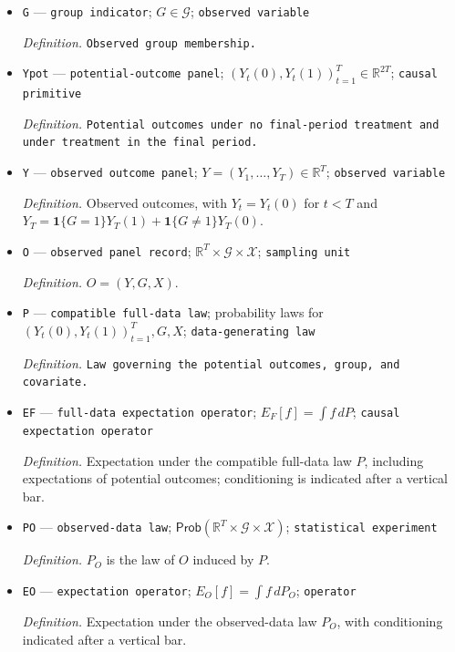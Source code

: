 \documentclass{article}
\begin{document}
\begin{itemize}
  \item \texttt{G} --- \texttt{group indicator}; \(G\in\mathcal G\); \texttt{observed variable}
  \par\smallskip\noindent\emph{Definition.} \texttt{Observed group membership.}
  \item \texttt{Ypot} --- \texttt{potential-\allowbreak{}outcome panel}; \((Y_t(0),Y_t(1))_{t=1}^{T}\in\mathbb R^{2T}\); \texttt{causal primitive}
  \par\smallskip\noindent\emph{Definition.} \texttt{Potential outcomes under no final-\allowbreak{}period treatment and under treatment in the final period.}
  \item \texttt{Y} --- \texttt{observed outcome panel}; \(Y=(Y_1,\ldots,Y_T)\in\mathbb R^T\); \texttt{observed variable}
  \par\smallskip\noindent\emph{Definition.} Observed outcomes, with \(Y_t=Y_t(0)\) for \(t<T\) and \(Y_T=\mathbf 1\{G=1\}Y_T(1)+\mathbf 1\{G\ne1\}Y_T(0)\).
  \item \texttt{O} --- \texttt{observed panel record}; \(\mathbb R^T\times\mathcal G\times\mathcal X\); \texttt{sampling unit}
  \par\smallskip\noindent\emph{Definition.} \(O=(Y,G,X)\).
  \item \texttt{P} --- \texttt{compatible full-\allowbreak{}data law}; probability laws for \((Y_t(0),Y_t(1))_{t=1}^{T},G,X\); \texttt{data-\allowbreak{}generating law}
  \par\smallskip\noindent\emph{Definition.} \texttt{Law governing the potential outcomes,\allowbreak{} group,\allowbreak{} and covariate.}
  \item \texttt{EF} --- \texttt{full-\allowbreak{}data expectation operator}; \(E_F[f]=\int f\,dP\); \texttt{causal expectation operator}
  \par\smallskip\noindent\emph{Definition.} Expectation under the compatible full-data law \(P\), including expectations of potential outcomes; conditioning is indicated after a vertical bar.
  \item \texttt{PO} --- \texttt{observed-\allowbreak{}data law}; \(\mathsf{Prob}(\mathbb R^T\times\mathcal G\times\mathcal X)\); \texttt{statistical experiment}
  \par\smallskip\noindent\emph{Definition.} \(P_O\) is the law of \(O\) induced by \(P\).
  \item \texttt{EO} --- \texttt{expectation operator}; \(E_O[f]=\int f\,dP_O\); \texttt{operator}
  \par\smallskip\noindent\emph{Definition.} Expectation under the observed-data law \(P_O\), with conditioning indicated after a vertical bar.

\end{itemize}
\end{document}
